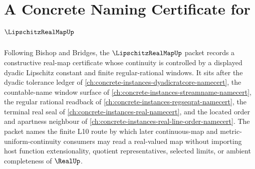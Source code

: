 \chapter{A Concrete Naming Certificate for $\LipschitzRealMapUp$}
\label{ch:concrete-instances-lipschitz-real-map-namecert}

Following Bishop and Bridges, the $\LipschitzRealMapUp$ packet records a constructive real-map certificate whose continuity is controlled by a displayed dyadic Lipschitz constant and finite regular-rational windows. It sits after the dyadic tolerance ledger of \autoref{ch:concrete-instances-dyadicratcore-namecert}, the countable-name window surface of \autoref{ch:concrete-instances-streamname-namecert}, the regular rational readback of \autoref{ch:concrete-instances-regseqrat-namecert}, the terminal real seal of \autoref{ch:concrete-instances-real-namecert}, and the located order and apartness neighbour of \autoref{ch:concrete-instances-real-line-order-namecert}. The packet names the finite L10 route by which later continuous-map and metric-uniform-continuity consumers may read a real-valued map without importing host function extensionality, quotient representatives, selected limits, or ambient completeness of $\RealUp$.

